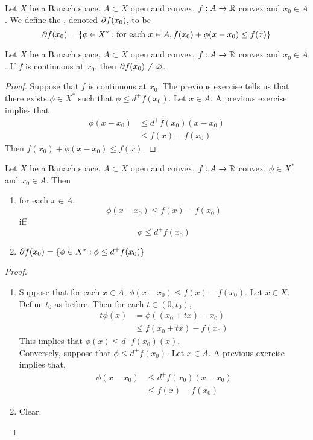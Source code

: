 \documentclass{book}
\begin{document}
	\begin{defn} \ld{}\\
	Let $X$ be a Banach space, $A \subset X$ open and convex, $f:A \rightarrow \mathbb{R}$ convex and $x_0 \in A$. We define the , denoted $\partial f(x_0)$, to be $$\partial f(x_0) = \{ \phi \in X^*: \text{for each } x \in A, f(x_0) + \phi(x-x_0) \leq f(x)\}$$
	\end{defn}
	
	\begin{ex} \lex{}
	Let $X$ be a Banach space, $A \subset X$ open and convex, $f:A \rightarrow \mathbb{R}$ convex and $x_0 \in A$. If $f$ is continuous at $x_0$, then $\partial f(x_0) \neq \varnothing$.
	\end{ex}
	
	\begin{proof}
	Suppose that $f$ is continuous at $x_0$. The previous exercise tells us that there exists $\phi \in X^*$ such that $\phi \leq d^+f(x_0)$. Let $x \in A$. A previous exercise implies that
	\begin{align*}
	\phi(x-x_0) 
	& \leq d^+f(x_0)(x - x_0) \\
	& \leq f(x) - f(x_0)
	\end{align*}
	Then $f(x_0) + \phi(x-x_0) \leq f(x)$.
	\end{proof}
	
	\begin{ex} \lex{}
	Let $X$ be a Banach space, $A \subset X$ open and convex, $f:A \rightarrow \mathbb{R}$ convex, $\phi \in X^*$ and $x_0 \in A$. Then 
	\begin{enumerate}
	\item for each $x \in A$, $$\phi(x-x_0) \leq f(x) - f(x_0)$$ iff  $$\phi \leq d^+f(x_0)$$ 
	\item  $\partial f(x_0) = \{ \phi \in X^*: \phi \leq d^+ f(x_0)\}$
	\end{enumerate}
	\end{ex}	
	
	\begin{proof}\
	\begin{enumerate}
	\item Suppose that for each $x \in A$, $\phi(x-x_0) \leq f(x) - f(x_0)$. Let $x \in X$. Define $t_0$ as before. Then for each $t \in (0, t_0)$, 
	\begin{align*}
	t\phi(x)
	&= \phi((x_0 + tx) - x_0) \\
	& \leq f(x_0 + tx) - f(x_0)
	\end{align*}	 
	This implies that $\phi(x) \leq d^+f(x_0)(x)$.\\
	Conversely, suppose that $\phi \leq d^+f(x_0)$. Let $x \in A$. A previous exercise implies that, 
	\begin{align*}
	\phi(x-x_0) 
	& \leq d^+f(x_0)(x-x_0) \\
	&\leq f(x) - f(x_0)
	\end{align*}
	\item Clear.
	\end{enumerate}
	\end{proof}
	
\end{document}

